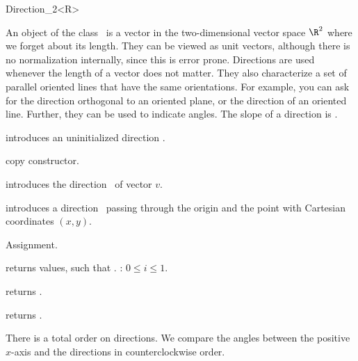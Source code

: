 \begin{ccRefClass} {Direction_2<R>}

\ccDefinition
An object of the class \ccRefName\ is a vector in the two-dimensional 
vector space $\R^2$  where we forget about its length. They can be
viewed as unit vectors, although there is no normalization internally,
since this is error prone.  Directions are used whenever the length of
a vector does not matter. 
They also characterize a set of parallel oriented lines that have the same
orientations.  
For example, you can ask for the direction
orthogonal to an oriented plane, or the direction of an oriented line.
Further, they can be used to indicate angles. The slope of a direction
is .


\ccCreation
{}


\ccHidden {}
             {introduces an uninitialized direction \ccVar.}

\ccHidden {}
 	    {copy constructor.}

	    {introduces the direction \ccVar\ of vector $v$.}

            {introduces a direction \ccVar\ passing through the origin
             and the point with Cartesian coordinates $(x, y)$.}


\ccOperations

\ccHidden {}
        {Assignment.}

       {returns values, such that \ccVar {}.
        \ccPrecond: $0 \leq i \leq 1$.}

       {returns .}

       {returns .}

There is a total order on directions. We compare the angles between the
positive $x$-axis and the directions in counterclockwise order.

       {}
\ccGlue
{}
       {}
\ccGlue
{}
       {}
\ccGlue
{}
       {}
\ccGlue
{}
       {}
\ccGlue
{}
       {}


\end{ccRefClass}
